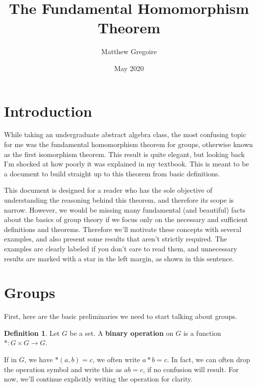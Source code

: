 \documentclass[12pt]{article}
\title{The Fundamental Homomorphism Theorem}
\author{Matthew Gregoire}
\date{May 2020}
\newcommand{\extra}{\marginpar{$*$}}
\theoremstyle{definition}
\theoremstyle{definition}
\newtheorem{definition}[theorem]{Definition}
\theoremstyle{definition}
\theoremstyle{definition}
\begin{document}
\maketitle

\tableofcontents

\pagebreak

\section{Introduction}

While taking an undergraduate abstract algebra class, the most confusing topic for me was the fundamental homomorphism theorem for groups, otherwise known as the first isomorphism theorem. This result is quite elegant, but looking back I'm shocked at how poorly it was explained in my textbook. This is meant to be a document to build straight up to this theorem from basic definitions.

This document is designed for a reader who has the sole objective of understanding the reasoning behind this theorem, and therefore its scope is narrow. However, we would be missing many fundamental (and beautiful) facts about the basics of  group theory if we focus only on the necessary and sufficient definitions and theorems. Therefore we'll motivate these concepts with several examples, and also present some results that aren't strictly required. \extra The examples are clearly labeled if you don't care to read them, and unnecessary results are marked with a star in the left margin, as shown in this sentence.

\section{Groups}

First, here are the basic preliminaries we need to start talking about groups.

\begin{definition}
\label{binaryoperation}
Let $G$ be a set. A \textbf{binary operation} on $G$ is a function $*: G \times G \to G$.
\end{definition}

If in $G$, we have $*(a, b) = c$, we often write $a * b = c$. In fact, we can often drop the operation symbol and write this as $ab = c$, if no confusion will result. For now, we'll continue explicitly writing the operation for clarity.
\end{document}
